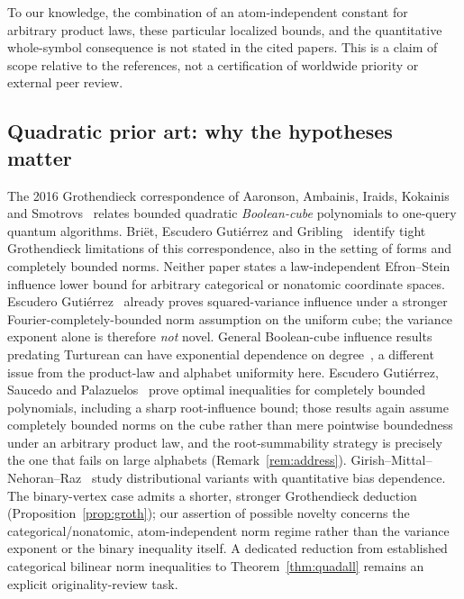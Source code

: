 \documentclass[11pt]{article}
\numberwithin{equation}{section}
\theoremstyle{remark}
\begin{document}
To our knowledge, the combination of an atom-independent constant for arbitrary product laws, these particular localized bounds, and the quantitative whole-symbol consequence is not stated in the cited papers. This is a claim of scope relative to the references, not a certification of worldwide priority or external peer review.

\subsection*{Quadratic prior art: why the hypotheses matter}
The 2016 Grothendieck correspondence of Aaronson, Ambainis, Iraids, Kokainis and Smotrovs~\cite{AAIKS16} relates bounded quadratic \emph{Boolean-cube} polynomials to one-query quantum algorithms. Bri\"et, Escudero Guti\'errez and Gribling~\cite{BEG24} identify tight Grothendieck limitations of this correspondence, also in the setting of forms and completely bounded norms. Neither paper states a law-independent Efron--Stein influence lower bound for arbitrary categorical or nonatomic coordinate spaces. Escudero Guti\'errez~\cite[Theorem~1.6]{EG23} already proves squared-variance influence under a stronger Fourier-completely-bounded norm assumption on the uniform cube; the variance exponent alone is therefore \emph{not} novel. General Boolean-cube influence results predating Turturean can have exponential dependence on degree~\cite{Tur26}, a different issue from the product-law and alphabet uniformity here. Escudero Guti\'errez, Saucedo and Palazuelos~\cite{ESP26} prove optimal inequalities for completely bounded polynomials, including a sharp root-influence bound; those results again assume completely bounded norms on the cube rather than mere pointwise boundedness under an arbitrary product law, and the root-summability strategy is precisely the one that fails on large alphabets (Remark~\ref{rem:address}). Girish--Mittal--Nehoran--Raz~\cite{GMNR26} study distributional variants with quantitative bias dependence. The binary-vertex case admits a shorter, stronger Grothendieck deduction (Proposition~\ref{prop:groth}); our assertion of possible novelty concerns the categorical/nonatomic, atom-independent norm regime rather than the variance exponent or the binary inequality itself. A dedicated reduction from established categorical bilinear norm inequalities to Theorem~\ref{thm:quadall} remains an explicit originality-review task.
\end{document}
